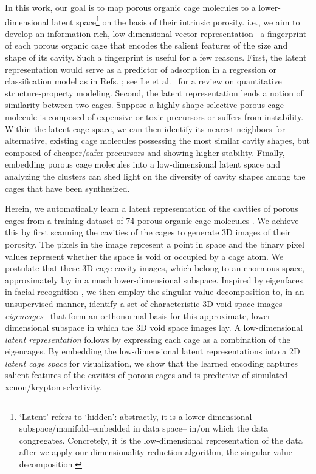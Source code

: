 \documentclass[journal=jacsat,manuscript=article,layout=traditional]{achemso}
\begin{document}
In this work, our goal is to map porous organic cage molecules to a lower-dimensional latent space\footnote{{\color{red} `Latent' refers to `hidden': abstractly, it is a lower-dimensional subspace/manifold--embedded in data space-- in/on which the data congregates. Concretely, it is the low-dimensional representation of the data after we apply our dimensionality reduction algorithm, the singular value decomposition.}} on the basis of their intrinsic porosity. i.e., we aim to develop an information-rich, low-dimensional vector representation-- a fingerprint-- of each porous organic cage that encodes the salient features of the size and shape of its cavity. Such a fingerprint is useful for a few reasons. First, the latent representation would serve as a predictor of adsorption in a regression or classification model as in Refs. \cite{bucior2018energy,simon2015best}; see Le et al.~\cite{le2012quantitative} for a review on quantitative structure-property modeling. Second, the latent representation lends a notion of similarity between two cages. Suppose a highly shape-selective porous cage molecule is composed of expensive or toxic precursors or suffers from instability. Within the latent cage space, we can then identify its nearest neighbors for alternative, existing cage molecules possessing the most similar cavity shapes, but composed of cheaper/safer precursors and showing higher stability. Finally, embedding porous cage molecules into a low-dimensional latent space and analyzing the clusters can shed light on the diversity of  cavity shapes among the cages that have been synthesized.

Herein, we automatically learn a latent representation of the cavities of porous cages from a training dataset of 74 porous organic cage molecules \cite{miklitz2017computational,greenaway2018high}. We achieve this by first scanning the cavities of the cages to generate 3D images of their porosity. The pixels in the image represent a point in space and the binary pixel values represent whether the space is void or occupied by a cage atom.
We postulate that these 3D cage cavity images, which belong to an enormous space, approximately lay in a much lower-dimensional subspace. Inspired by eigenfaces in facial recognition \cite{sirovich1987low,turk1991face,muller2004singular}, we then employ the singular value decomposition to, in an unsupervised manner, identify a set of characteristic 3D void space images-- \emph{eigencages}-- that form an orthonormal basis for this approximate, lower-dimensional subspace in which the 3D void space images lay. A low-dimensional \emph{latent representation} follows by expressing each cage as a combination of the eigencages. By embedding the low-dimensional latent representations into a 2D \emph{latent cage space} for visualization, we show that the learned encoding captures salient features of the cavities of porous cages and is predictive of simulated xenon/krypton selectivity.
\end{document}
